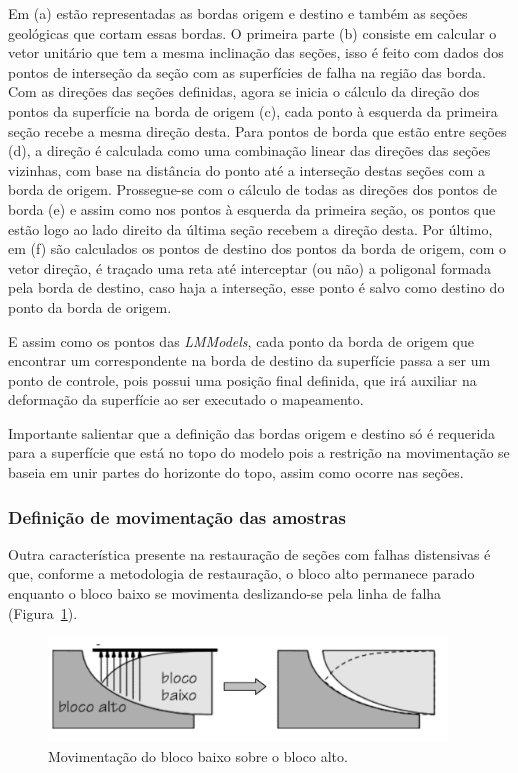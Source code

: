 Em (a) estão representadas as bordas origem e destino e também as seções geológicas que cortam essas bordas. O primeira parte (b) consiste em calcular o vetor unitário que tem a mesma inclinação das seções, isso é feito com dados dos pontos de interseção da seção com as superfícies de falha na região das borda. Com as direções das seções definidas, agora se inicia o cálculo da direção dos pontos da superfície na borda de origem (c), cada ponto à esquerda da primeira seção recebe a mesma direção desta. Para pontos de borda que estão entre seções (d), a direção é calculada como uma combinação linear das direções das seções vizinhas, com base na distância do ponto até a interseção destas seções com a borda de origem. Prossegue-se com o cálculo de todas as direções dos pontos de borda (e) e assim como nos pontos à esquerda da primeira seção, os pontos que estão logo ao lado direito da última seção recebem a direção desta. Por último, em (f) são calculados os pontos de destino dos pontos da borda de origem, com o vetor direção, é traçado uma reta até interceptar (ou não) a poligonal formada pela borda de destino, caso haja a interseção, esse ponto é salvo como destino do ponto da borda de origem.

E assim como os pontos das \textit{LMModels}, cada ponto da borda de origem que encontrar um correspondente na borda de destino da superfície passa a ser um ponto de controle, pois possui uma posição final definida, que irá auxiliar na deformação da superfície ao ser executado o mapeamento.

Importante salientar que a definição das bordas origem e destino só é requerida para a superfície que está no topo do modelo pois a restrição na movimentação se baseia em unir partes do horizonte do topo, assim como ocorre nas seções.

\subsubsection{Definição de movimentação das amostras}

Outra característica presente na restauração de seções com falhas distensivas é que, conforme a metodologia de restauração, o bloco alto permanece parado enquanto o bloco baixo se movimenta deslizando-se pela linha de falha (Figura~\ref{fig-hang-foot-wall}).

\begin{figure} [H]
  \begin{center}
    \includegraphics[width=300pt]{images/fig-hang-foot-wall}
    \caption{Movimentação do bloco baixo sobre o bloco alto.\cite{Santi}}\label{fig-hang-foot-wall}
  \end{center}
\end{figure}

